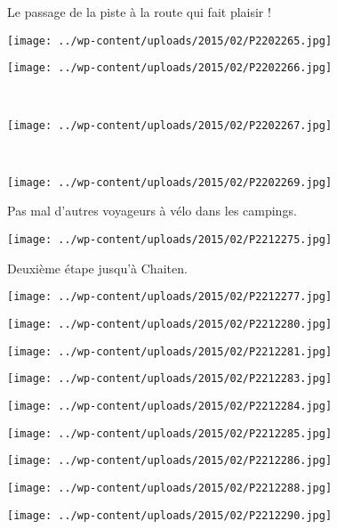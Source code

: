 \pagebreak
Le passage de la piste à la route qui fait plaisir !
\begin{center} \texttt{[image: ../wp-content/uploads/2015/02/P2202265.jpg]} \end{center}
\begin{center} \texttt{[image: ../wp-content/uploads/2015/02/P2202266.jpg]} \end{center}
\vspace{-\topsep}
\vspace{-3.25mm}

\pagebreak
~
\begin{center} \texttt{[image: ../wp-content/uploads/2015/02/P2202267.jpg]} \end{center}
~
\begin{center} \texttt{[image: ../wp-content/uploads/2015/02/P2202269.jpg]} \end{center}
\vspace{-\topsep}

\pagebreak
Pas mal d'autres voyageurs à vélo dans les campings.
\begin{center} \texttt{[image: ../wp-content/uploads/2015/02/P2212275.jpg]} \end{center}

Deuxième étape jusqu'à Chaiten.
\begin{center} \texttt{[image: ../wp-content/uploads/2015/02/P2212277.jpg]} \end{center}
\begin{center} \texttt{[image: ../wp-content/uploads/2015/02/P2212280.jpg]} \end{center}
\begin{center} \texttt{[image: ../wp-content/uploads/2015/02/P2212281.jpg]} \end{center}
\begin{center} \texttt{[image: ../wp-content/uploads/2015/02/P2212283.jpg]} \end{center}
\begin{center} \texttt{[image: ../wp-content/uploads/2015/02/P2212284.jpg]} \end{center}
\begin{center} \texttt{[image: ../wp-content/uploads/2015/02/P2212285.jpg]} \end{center}
\begin{center} \texttt{[image: ../wp-content/uploads/2015/02/P2212286.jpg]} \end{center}
\begin{center} \texttt{[image: ../wp-content/uploads/2015/02/P2212288.jpg]} \end{center}
\vfill
\begin{center} \texttt{[image: ../wp-content/uploads/2015/02/P2212290.jpg]} \end{center}
\vspace{-\topsep}
\vspace{-0.75mm}

